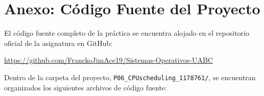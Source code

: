 \documentclass[12pt]{article}
\begin{document}
\newpage
\section*{Anexo: Código Fuente del Proyecto}

El código fuente completo de la práctica se encuentra alojado en el repositorio oficial de la asignatura en GitHub:

\begin{center}
    \url{https://github.com/FranckoJimAce19/Sistemas-Operativos-UABC}
\end{center}

Dentro de la carpeta del proyecto, \texttt{P06\_CPUscheduling\_1178761/}, se encuentran organizados los siguientes archivos de código fuente:
\end{document}
